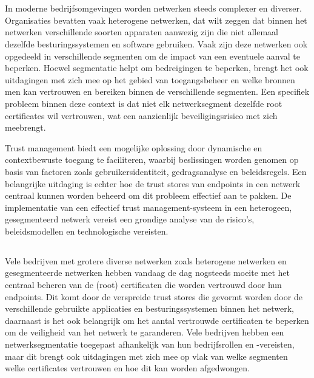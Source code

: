 
\chapter{}%
\label{ch:inleiding}

In moderne bedrijfsomgevingen worden netwerken steeds complexer en diverser. Organisaties bevatten vaak heterogene netwerken, dat wilt zeggen dat binnen het netwerken verschillende soorten apparaten aanwezig zijn die niet allemaal dezelfde besturingssystemen en software gebruiken. 
Vaak zijn deze netwerken ook opgedeeld in verschillende segmenten om de impact van een eventuele aanval te beperken.
Hoewel segmentatie helpt om bedreigingen te beperken, brengt het ook uitdagingen met zich mee op het gebied van toegangsbeheer en welke bronnen men kan vertrouwen en bereiken binnen de verschillende segmenten. 
Een specifiek probleem binnen deze context is dat niet elk netwerksegment dezelfde root certificates wil vertrouwen, wat een aanzienlijk beveiligingsrisico met zich meebrengt.

Trust management biedt een mogelijke oplossing door dynamische en contextbewuste toegang te faciliteren, waarbij beslissingen worden genomen op basis van factoren zoals gebruikersidentiteit, gedragsanalyse en beleidsregels. Een belangrijke uitdaging is echter hoe de trust stores van endpoints in een netwerk centraal kunnen worden beheerd om dit probleem effectief aan te pakken. De implementatie van een effectief trust management-systeem in een heterogeen, gesegmenteerd netwerk vereist een grondige analyse van de risico's, beleidsmodellen en technologische vereisten.

\section{}%
\label{sec:probleemstelling}

Vele bedrijven met grotere diverse netwerken zoals heterogene netwerken en gesegmenteerde netwerken hebben vandaag de dag nogsteeds moeite met het centraal beheren van de (root) certificaten die worden vertrouwd door hun endpoints. 
Dit komt door de verspreide trust stores die gevormt worden door de verschillende gebruikte applicaties en besturingssystemen binnen het netwerk, daarnaast is het ook belangrijk om het aantal vertrouwde certificaten te beperken om de veiligheid van het netwerk te garanderen.
Vele bedrijven hebben een netwerksegmentatie toegepast afhankelijk van hun bedrijfsrollen en -vereisten, maar dit brengt ook uitdagingen met zich mee op vlak van welke segmenten welke certificates vertrouwen en hoe dit kan worden afgedwongen.

